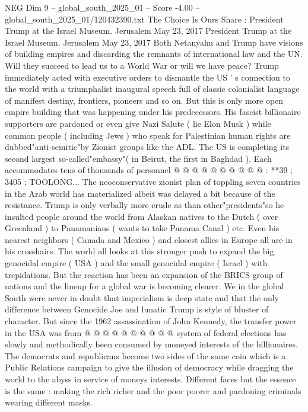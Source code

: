 \begin{textsample}{NEG Dim 9 – global\_south\_2025\_01 – Score -4.00 – global\_south\_2025\_01/120432390.txt}  \label{ex:f9_neg_113}
The Choice Is Ours Share : President Trump at the Israel Museum.
Jerusalem May 23, 2017 President Trump at the Israel Museum.
Jerusalem May 23, 2017 Both Netanyahu and Trump have visions of building empires and discarding the remnants of international law and the UN.
Will they succeed to lead us to a World War or will we have peace?
Trump immediately acted with executive orders to dismantle the US ' s connection to the world with a triumphalist inaugural speech full of classic colonialist language of manifest destiny, frontiers, pioneers and so on.
But this is only more open empire building that was happening under his predecessors.
His fascist billionaire supporters are pardoned or even give Nazi Salute ( lie Elon Musk ) while common people ( including Jews ) who speak for Palestinian human rights are dubbed"anti-semitic"by Zionist groups like the ADL.
The US is completing its second largest so-called"embassy"( in Beirut, the first in Baghdad ).
Each accommodates tens of thousands of personnel @ @ @ @ @ @ @ @ @ @ : **39 ; 3405 ; TOOLONG...
The neoconservative zionist plan of toppling seven countries in the Arab world has materialized albeit was delayed a bit because of the resistance.
Trump is only verbally more crude as than other"presidents"so he insulted people around the world from Alaskan natives to the Dutch ( over Greenland ) to Panamanians ( wants to take Panama Canal ) etc.
Even his nearest neighbors ( Canada and Mexico ) and closest allies in Europe all are in his crosshairs.
The world all looks at this stronger push to expand the big genocidal empire ( USA ) and the small genocidal empire ( Israel ) with trepidations.
But the reaction has been an expansion of the BRICS group of nations and the lineup for a global war is becoming clearer.
We in the global South were never in doubt that imperialism is deep state and that the only difference between Genocide Joe and lunatic Trump is style of bluster of character.
But since the 1962 assassination of John Kennedy, the transfer power in the USA was from @ @ @ @ @ @ @ @ @ @ system of federal elections has slowly and methodically been consumed by moneyed interests of the billionaires.
The democrats and republicans become two sides of the same coin which is a Public Relations campaign to give the illusion of democracy while dragging the world to the abyss in service of moneys interests.
Different faces but the essence is the same : making the rich richer and the poor poorer and pardoning criminals wearing different masks.

\end{textsample}
